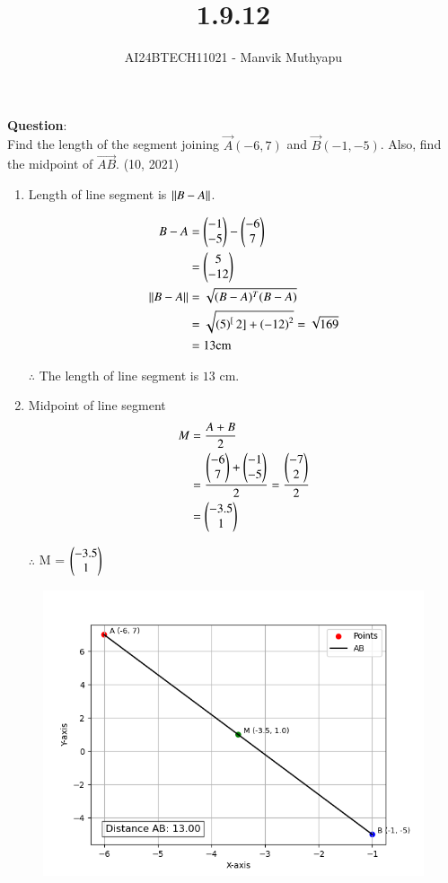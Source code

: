 \documentclass[journal,12pt,onecolumn]{IEEEtran}
\title{1.9.12}
\author{AI24BTECH11021 - Manvik Muthyapu}
\theoremstyle{remark}
\begin{document}


\maketitle
\bigskip

\renewcommand{\thefigure}{\theenumi}
\renewcommand{\thetable}{\theenumi}


\textbf{Question}:\\

Find the length of the segment joining $\vec{A}(-6, 7)$ and $\vec{B}(-1, -5)$. Also, find the midpoint of $\vec{AB}$.
\hfill (10, 2021)\\

\solution

\begin{table}[h!]    
  \centering
  
  \label{tab 1.8.18}
\end{table}

\begin{enumerate}

	\item Length of line segment is $\left\lVert B-A\right\rVert$.

\begin{align}
	B-A &= \begin{pmatrix}-1\\-5\end{pmatrix}-\begin{pmatrix}-6\\7\end{pmatrix}\\
            &= \begin{pmatrix}5\\-12\end{pmatrix}\\
	\left\lVert B-A\right\rVert &= \sqrt{(B-A)^{T}(B-A)}\\
	&=\sqrt{\left(5\right)^[2] + \left(-12\right)^{2}} = \sqrt{169}\\
	    &= 13 \text{cm}
\end{align}

$\therefore$ The length of line segment is $13$ cm.\\

\item Midpoint of line segment 
\begin{align}
	M &= \frac{A+B}{2}\\
	  &= \frac{\begin{pmatrix}-6\\7\end{pmatrix} + \begin{pmatrix}-1\\-5\end{pmatrix}}{2} = \frac{\begin{pmatrix}-7\\2\end{pmatrix}}{2}\\
	  &= \begin{pmatrix}-3.5\\1\end{pmatrix}
\end{align}

		$\therefore$ M = $\begin{pmatrix}-3.5\\1\end{pmatrix}$

\end{enumerate}

\begin{figure}[h!]
	\centering
	\includegraphics[width=0.7\linewidth]{figs/fig1.png}
\end{figure}
\end{document}
